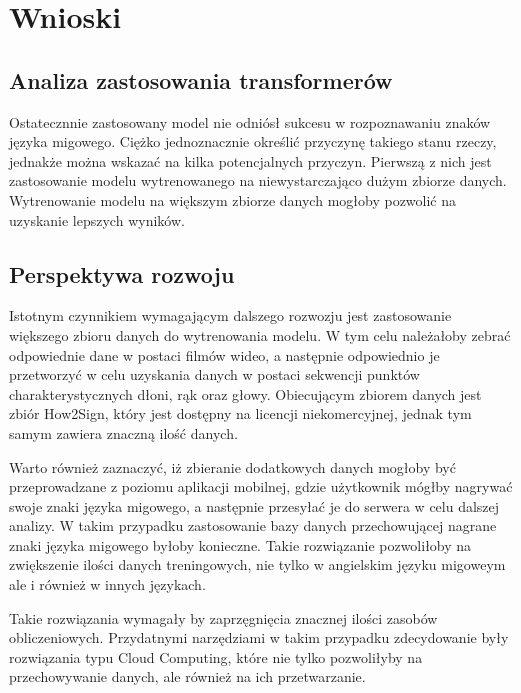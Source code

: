 \chapter{Wnioski}
\section{Analiza zastosowania transformerów}
Ostatecznnie zastosowany model nie odniósł sukcesu w rozpoznawaniu znaków języka migowego.
Ciężko jednoznacznie określić przyczynę takiego stanu rzeczy, jednakże można wskazać na kilka potencjalnych przyczyn.
Pierwszą z nich jest zastosowanie modelu wytrenowanego na niewystarczająco dużym zbiorze danych.
Wytrenowanie modelu na większym zbiorze danych mogłoby pozwolić na uzyskanie lepszych wyników.

\section{Perspektywa rozwoju}
Istotnym czynnikiem wymagającym dalszego rozwozju jest zastosowanie większego zbioru danych do wytrenowania modelu.
W tym celu należałoby zebrać odpowiednie dane w postaci filmów wideo, a następnie odpowiednio je przetworzyć w celu uzyskania danych w postaci sekwencji punktów charakterystycznych dłoni, rąk oraz głowy.
Obiecującym zbiorem danych jest zbiór How2Sign, który jest dostępny na licencji niekomercyjnej, jednak tym samym zawiera znaczną ilość danych.

Warto również zaznaczyć, iż zbieranie dodatkowych danych mogłoby być przeprowadzane z poziomu aplikacji mobilnej, gdzie użytkownik mógłby nagrywać swoje znaki języka migowego, a następnie przesyłać je do serwera w celu dalszej analizy.
W takim przypadku zastosowanie bazy danych przechowującej nagrane znaki języka migowego byłoby konieczne.
Takie rozwiązanie pozwoliłoby na zwiększenie ilości danych treningowych, nie tylko w angielskim języku migoweym ale i również w innych językach.

Takie rozwiązania wymagały by zaprzęgnięcia znacznej ilości zasobów obliczeniowych.
Przydatnymi narzędziami w takim przypadku zdecydowanie były rozwiązania typu Cloud Computing, które nie tylko pozwoliłyby na przechowywanie danych, ale również na ich przetwarzanie.


